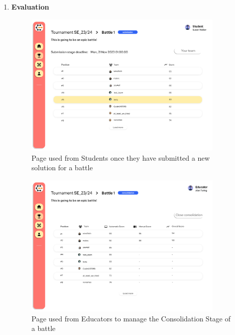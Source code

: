 \begin{enumerate}[label=\textbf{F\arabic*)}]
    \item \textbf{Evaluation}\\
    \begin{figure}[H]
        \centering
        \includegraphics[width=0.9\textwidth]{Mockups/14_student_battle_submission.png}
        \caption{Page used from Students once they have submitted a new solution for a battle}
    \end{figure}
    \begin{figure}[H]
        \centering
        \includegraphics[width=0.9\textwidth]{Mockups/16_educator_battle_consolidation.png}
        \caption{Page used from Educators to manage the Consolidation Stage of a battle}
    \end{figure}
    \begin{figure}[H]
        \centering

\end{figure}
\end{enumerate}
